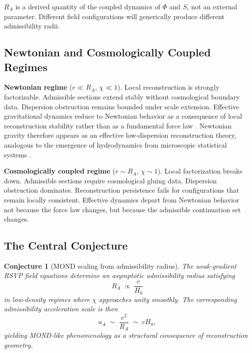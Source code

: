 \documentclass[11pt, a4paper]{article}
\theoremstyle{plain}
\newtheorem{conjecture}[theorem]{Conjecture}
\theoremstyle{definition}
\theoremstyle{remark}
\newcommand{\RA}{R_{\!A}}
\newcommand{\aA}{a_{\!A}}
\begin{document}
$\RA$ is a derived quantity of the coupled dynamics of $\Phi$ and $S$, not an
external parameter. Different field configurations will generically produce different
admissibility radii.

\subsection{Newtonian and Cosmologically Coupled Regimes}

\medskip
\noindent\textbf{Newtonian regime} ($r \ll \RA$, $\chi \ll 1$).\quad
Local reconstruction is strongly factorizable. Admissible sections extend stably
without cosmological boundary data. Dispersion obstruction remains bounded under
scale extension. Effective gravitational dynamics reduce to Newtonian behavior as a
consequence of local reconstruction stability rather than as a fundamental force law
\cite{verlinde2011}. Newtonian gravity therefore appears as an effective
low-dispersion reconstruction theory, analogous to the emergence of hydrodynamics
from microscopic statistical systems \cite{goldenfeld1992}.

\medskip
\noindent\textbf{Cosmologically coupled regime} ($r \sim \RA$, $\chi \sim 1$).\quad
Local factorization breaks down. Admissible sections require cosmological gluing
data. Dispersion obstruction dominates. Reconstruction persistence fails for
configurations that remain locally consistent. Effective dynamics depart from
Newtonian behavior not because the force law changes, but because the admissible
continuation set changes.

\subsection{The Central Conjecture}

\begin{conjecture}[MOND scaling from admissibility radius]
\label{conj:RA}
The weak-gradient RSVP field equations determine an asymptotic admissibility radius
satisfying
\begin{equation}
  \RA \;\propto\; \frac{c}{H_0}
\end{equation}
in low-density regimes where $\chi$ approaches unity smoothly. The corresponding
admissibility acceleration scale is then
\begin{equation}
  \aA \;\sim\; \frac{c^2}{\RA} \;\sim\; cH_0,
\end{equation}
yielding MOND-like phenomenology as a structural consequence of reconstruction
geometry.
\end{conjecture}
\end{document}
